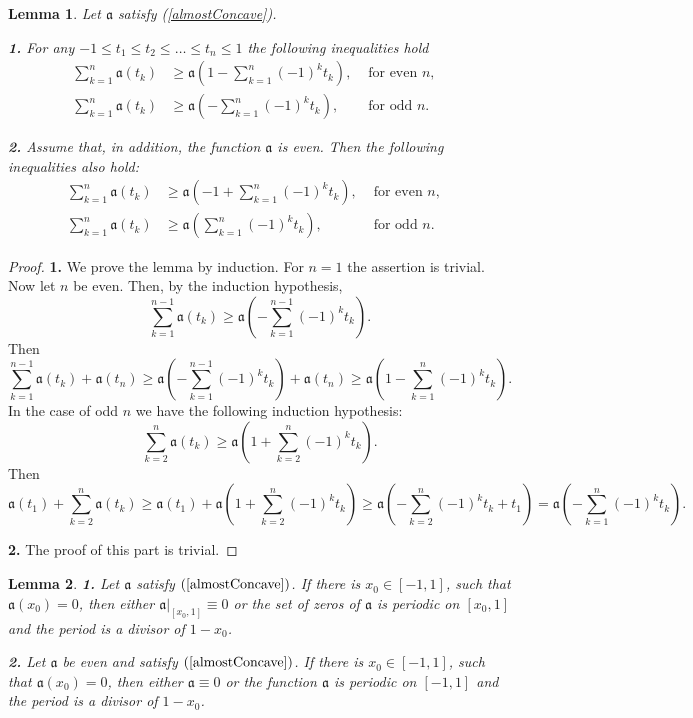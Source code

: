 \documentclass[12pt]{article}
\renewcommand{\ge}{\geqslant}
\renewcommand{\le}{\leqslant}
\newtheorem{lm}{Lemma}
\begin{document}
\begin{lm}
\label{weightSum}
Let $\mathfrak a$ satisfy (\ref{almostConcave}).

{\bf 1.} For any $-1 \le t_1 \le t_2 \le \ldots \le t_n \le 1$
the following inequalities hold
\begin{align*}
\sum_{k = 1}^n \mathfrak a(t_k) & \ge \mathfrak a( 1 - \sum_{k = 1}^n (-1)^k t_k), & \text{ for even $n$}, & \\
\sum_{k = 1}^n \mathfrak a(t_k) & \ge \mathfrak a(- \sum_{k = 1}^n (-1)^k t_k), & \text{ for odd $n$}. &
\end{align*}

{\bf 2.}
Assume that, in addition, the function $\mathfrak a$ is even.
Then the following inequalities also hold:
\begin{align*}
\sum_{k = 1}^n \mathfrak a(t_k) & \ge \mathfrak a(-1 + \sum_{k = 1}^n (-1)^k t_k), & \text{ for even $n$}, & \\
\sum_{k = 1}^n \mathfrak a(t_k) & \ge \mathfrak a(\sum_{k = 1}^n (-1)^k t_k), & \text{ for odd $n$}. &
\end{align*}
\end{lm}

\begin{proof}
{\bf 1.}
We prove the lemma by induction.
For $n = 1$ the assertion is trivial.
Now let $n$ be even. Then, by the induction hypothesis,
$$\sum_{k=1}^{n - 1} \mathfrak a(t_k) \ge \mathfrak a( -\sum_{k = 1}^{n - 1} (-1)^k t_k ).$$
Then
$$\sum_{k = 1}^{n - 1} \mathfrak a( t_k ) + \mathfrak a( t_n ) \ge \mathfrak a( -\sum_{k = 1}^{n - 1} (-1)^k t_k ) + \mathfrak a( t_n ) \ge
\mathfrak a( 1 - \sum_{k = 1}^{n} (-1)^k t_k ).$$
In the case of odd $n$ we have the following induction hypothesis:
$$\sum_{k=2}^n \mathfrak a(t_k) \ge \mathfrak a( 1 + \sum_{k = 2}^n (-1)^k t_k ).$$
Then
$$\mathfrak a( t_1 ) + \sum_{k = 2}^n \mathfrak a( t_k ) \ge \mathfrak a( t_1 ) + \mathfrak a( 1 + \sum_{k = 2}^{n} (-1)^k t_k ) \ge
\mathfrak a( -\sum_{k = 2}^{n} (-1)^k t_k + t_1 ) = \mathfrak a( -\sum_{k = 1}^{n} (-1)^k t_k ).$$

{\bf 2.} The proof of this part is trivial. 
\end{proof}

\begin{lm}
\label{periodicity}
{\bf 1.} Let $\mathfrak a$ satisfy $(\ref{almostConcave})$.
If there is $x_0 \in [-1, 1]$, such that $\mathfrak a(x_0) = 0$,
then either $\mathfrak a \Big|_{[x_0, 1]} \equiv 0$
or the set of zeros of $\mathfrak a$ is periodic on $[x_0, 1]$
and the period is a divisor of $1 - x_0$.

{\bf 2.} Let $\mathfrak a$ be even and satisfy $(\ref{almostConcave})$.
If there is $x_0 \in [-1, 1]$, such that $\mathfrak a(x_0) = 0$,
then either $\mathfrak a \equiv 0$
or the function $\mathfrak a$ is periodic on $[-1, 1]$
and the period is a divisor of $1 - x_0$.
\end{lm}
\end{document}
